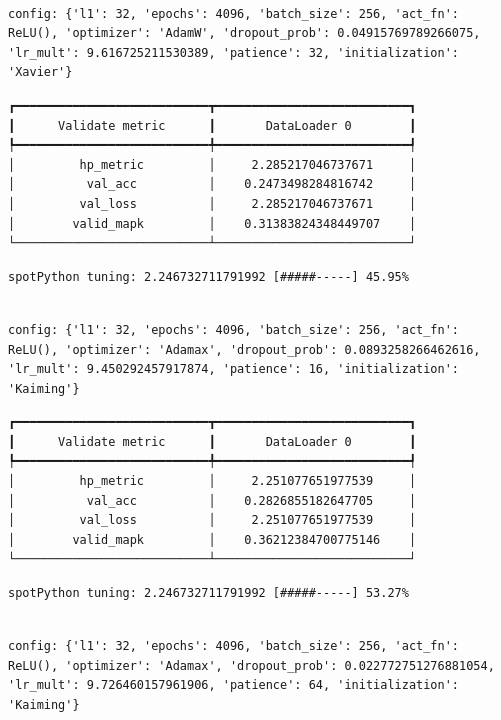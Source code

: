 \documentclass[
  letterpaper,
  DIV=11,
  numbers=noendperiod]{scrreprt}
\begin{document}
\begin{verbatim}

config: {'l1': 32, 'epochs': 4096, 'batch_size': 256, 'act_fn': ReLU(), 'optimizer': 'AdamW', 'dropout_prob': 0.04915769789266075, 'lr_mult': 9.616725211530389, 'patience': 32, 'initialization': 'Xavier'}
\end{verbatim}

\begin{verbatim}
┏━━━━━━━━━━━━━━━━━━━━━━━━━━━┳━━━━━━━━━━━━━━━━━━━━━━━━━━━┓
┃      Validate metric      ┃       DataLoader 0        ┃
┡━━━━━━━━━━━━━━━━━━━━━━━━━━━╇━━━━━━━━━━━━━━━━━━━━━━━━━━━┩
│         hp_metric         │     2.285217046737671     │
│          val_acc          │    0.2473498284816742     │
│         val_loss          │     2.285217046737671     │
│        valid_mapk         │    0.31383824348449707    │
└───────────────────────────┴───────────────────────────┘
\end{verbatim}

\begin{verbatim}
spotPython tuning: 2.246732711791992 [#####-----] 45.95% 
\end{verbatim}

\begin{verbatim}

config: {'l1': 32, 'epochs': 4096, 'batch_size': 256, 'act_fn': ReLU(), 'optimizer': 'Adamax', 'dropout_prob': 0.0893258266462616, 'lr_mult': 9.450292457917874, 'patience': 16, 'initialization': 'Kaiming'}
\end{verbatim}

\begin{verbatim}
┏━━━━━━━━━━━━━━━━━━━━━━━━━━━┳━━━━━━━━━━━━━━━━━━━━━━━━━━━┓
┃      Validate metric      ┃       DataLoader 0        ┃
┡━━━━━━━━━━━━━━━━━━━━━━━━━━━╇━━━━━━━━━━━━━━━━━━━━━━━━━━━┩
│         hp_metric         │     2.251077651977539     │
│          val_acc          │    0.2826855182647705     │
│         val_loss          │     2.251077651977539     │
│        valid_mapk         │    0.36212384700775146    │
└───────────────────────────┴───────────────────────────┘
\end{verbatim}

\begin{verbatim}
spotPython tuning: 2.246732711791992 [#####-----] 53.27% 
\end{verbatim}

\begin{verbatim}

config: {'l1': 32, 'epochs': 4096, 'batch_size': 256, 'act_fn': ReLU(), 'optimizer': 'Adamax', 'dropout_prob': 0.022772751276881054, 'lr_mult': 9.726460157961906, 'patience': 64, 'initialization': 'Kaiming'}
\end{verbatim}
\end{document}
